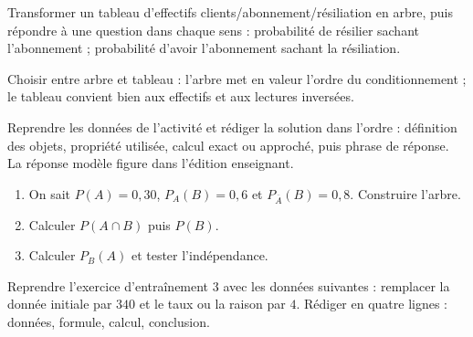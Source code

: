\begin{activite}
Transformer un tableau d'effectifs clients/abonnement/résiliation en arbre, puis répondre à une question dans chaque sens : probabilité de résilier sachant l'abonnement ; probabilité d'avoir l'abonnement sachant la résiliation.

\end{activite}

\begin{traceecrite}Choisir entre arbre et tableau : l'arbre met en valeur l'ordre du conditionnement ; le tableau convient bien aux effectifs et aux lectures inversées.\end{traceecrite}

\begin{exemple}
Reprendre les données de l'activité et rédiger la solution dans l'ordre : définition des objets, propriété utilisée, calcul exact ou approché, puis phrase de réponse. La réponse modèle figure dans l'édition enseignant.
\end{exemple}

\begin{exercice}[-- essentiel]
\begin{enumerate}\item On sait $P(A)=0{,}30$, $P_A(B)=0{,}6$ et $P_{\overline A}(B)=0{,}8$. Construire l'arbre.\item Calculer $P(A\cap B)$ puis $P(B)$.\item Calculer $P_B(A)$ et tester l'indépendance.\end{enumerate}
\end{exercice}


\begin{dm}Reprendre l'exercice d'entraînement 3 avec les données suivantes : remplacer la donnée initiale par $340$ et le taux ou la raison par $4$. Rédiger en quatre lignes : données, formule, calcul, conclusion.\end{dm}

